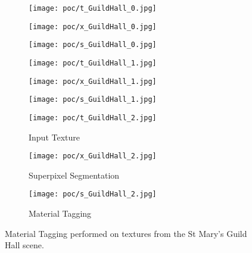 \begin{figure}
    \centering
    \begin{subfigure}[t]{0.3\textwidth}
       \centering
       \texttt{[image: poc/t\_GuildHall\_0.jpg]}

    \end{subfigure}
    \begin{subfigure}[t]{0.3\textwidth}
       \centering
       \texttt{[image: poc/x\_GuildHall\_0.jpg]}

    \end{subfigure}
    \begin{subfigure}[t]{0.3\textwidth}
        \centering
        \texttt{[image: poc/s\_GuildHall\_0.jpg]}
     \end{subfigure}


    \addvspace{\baselineskip}


    \centering
    \begin{subfigure}[t]{0.3\textwidth}
       \centering
       \texttt{[image: poc/t\_GuildHall\_1.jpg]}

    \end{subfigure}
    \begin{subfigure}[t]{0.3\textwidth}
       \centering
       \texttt{[image: poc/x\_GuildHall\_1.jpg]}

    \end{subfigure}
    \begin{subfigure}[t]{0.3\textwidth}
        \centering
        \texttt{[image: poc/s\_GuildHall\_1.jpg]}
     \end{subfigure}


    \addvspace{\baselineskip}

    
    \centering
    \begin{subfigure}[t]{0.3\textwidth}
       \centering
       \texttt{[image: poc/t\_GuildHall\_2.jpg]}
       \caption{Input Texture}
    \end{subfigure}
    \begin{subfigure}[t]{0.3\textwidth}
       \centering
       \texttt{[image: poc/x\_GuildHall\_2.jpg]}
       \caption{Superpixel Segmentation}
    \end{subfigure}
    \begin{subfigure}[t]{0.3\textwidth}
        \centering
        \texttt{[image: poc/s\_GuildHall\_2.jpg]}
        \caption{Material Tagging}
     \end{subfigure}
 

\caption{Material Tagging performed on textures from the St Mary's Guild Hall scene.}
\label{fig:guild-hall-superpixels}
\end{figure}